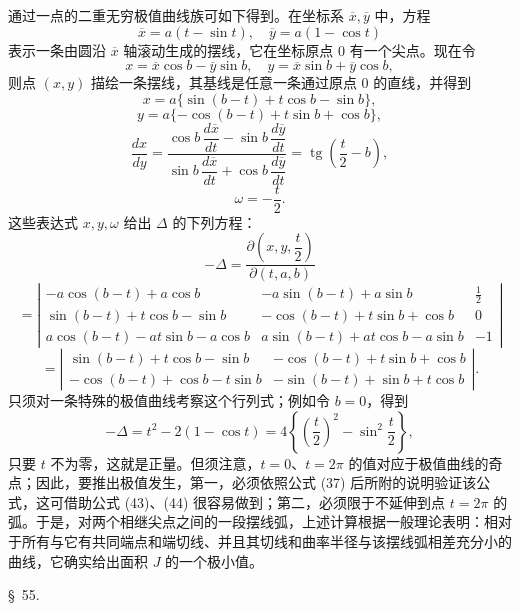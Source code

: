 \documentclass[11pt,a4paper,leqno]{article}
\newcommand{\tg}{\operatorname{tg}}
\begin{document}
通过一点的二重无穷极值曲线族可如下得到。在坐标系 $\overline{x},\overline{y}$ 中，方程
\begin{equation}\tag{43}
\overline{x}=a(t-\sin t),\quad \overline{y}=a(1-\cos t)
\end{equation}
表示一条由圆沿 $\overline{x}$ 轴滚动生成的摆线，它在坐标原点 0 有一个尖点。现在令
\begin{equation}\tag{44}
x=\overline{x}\cos b-\overline{y}\sin b,\quad
y=\overline{x}\sin b+\overline{y}\cos b,
\end{equation}
则点 $(x,y)$ 描绘一条摆线，其基线是任意一条通过原点 0 的直线，并得到
\[
x=a\{\sin(b-t)+t\cos b-\sin b\},
\]
\[
y=a\{-\cos(b-t)+t\sin b+\cos b\},
\]
\[
\frac{dx}{dy}=
\frac{\cos b\,\dfrac{d\overline{x}}{dt}-\sin b\,\dfrac{d\overline{y}}{dt}}
{\sin b\,\dfrac{d\overline{x}}{dt}+\cos b\,\dfrac{d\overline{y}}{dt}}
=\tg\left(\frac{t}{2}-b\right),
\]
\[
\omega=-\frac{t}{2}.
\]
这些表达式 $x,y,\omega$ 给出 $\Delta$ 的下列方程：
\[
-\Delta=
\frac{\partial\left(x,y,\dfrac{t}{2}\right)}{\partial(t,a,b)}
\]
\[
=
\left|
\begin{array}{ccc}
-a\cos(b-t)+a\cos b & -a\sin(b-t)+a\sin b & \frac12\\
\sin(b-t)+t\cos b-\sin b & -\cos(b-t)+t\sin b+\cos b & 0\\
a\cos(b-t)-at\sin b-a\cos b & a\sin(b-t)+at\cos b-a\sin b & -1
\end{array}
\right|
\]
\[
=
\left|
\begin{array}{cc}
\sin(b-t)+t\cos b-\sin b & -\cos(b-t)+t\sin b+\cos b\\
-\cos(b-t)+\cos b-t\sin b & -\sin(b-t)+\sin b+t\cos b
\end{array}
\right|.
\]
只须对一条特殊的极值曲线考察这个行列式；例如令 $b=0$，得到
\[
-\Delta=t^2-2(1-\cos t)=4\left\{\left(\frac{t}{2}\right)^2-\sin^2\frac{t}{2}\right\},
\]
只要 $t$ 不为零，这就是正量。但须注意，$t=0$、$t=2\pi$ 的值对应于极值曲线的奇点；因此，要推出极值发生，第一，必须依照公式 (37) 后所附的说明验证该公式，这可借助公式 (43)、(44) 很容易做到；第二，必须限于不延伸到点 $t=2\pi$ 的弧。于是，对两个相继尖点之间的一段摆线弧，上述计算根据一般理论表明：相对于所有与它有共同端点和端切线、并且其切线和曲率半径与该摆线弧相差充分小的曲线，它确实给出面积 $J$ 的一个极小值。

\begin{center}
{\large \S~55.}
\end{center}
\end{document}
